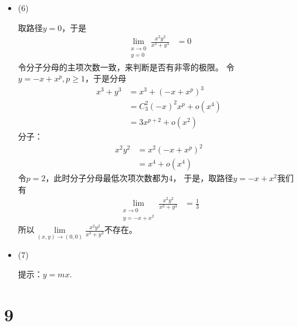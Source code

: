\documentclass{article}
\begin{document}
\begin{itemize}
  \item (6)

        取路径$y = 0$，于是
        \begin{align*}
          \lim\limits_{\substack{x \to 0 \\ y = 0}} \frac{x^2 y^2}{x^3+y^3}
           & = 0
        \end{align*}
        令分子分母的主项次数一致，来判断是否有非零的极限。
        令$y = -x + x^p, p \geq 1$，于是分母
        \begin{align*}
          x^3 + y^3
           & = x^3 + (-x + x^p)^3          \\
           & = C_{3}^2 (-x)^2 x^p + o(x^4) \\
           & = 3 x^{p + 2} + o(x^2)
        \end{align*}
        分子：
        \begin{align*}
          x^2 y^2
           & = x^2 (-x + x^p)^2 \\
           & = x^4 + o(x^4)
        \end{align*}
        令$p = 2$，此时分子分母最低次项次数都为4，
        于是，取路径$y = -x + x^2$我们有
        \begin{align*}
          \lim\limits_{\substack{x \to 0 \\ y = -x + x^2}} \frac{x^2 y^2}{x^3+y^3}
           & = \frac{1}{3}
        \end{align*}
        所以$\lim\limits_{(x, y) \to (0, 0)} \frac{x^2 y^2}{x^3+y^3}$不存在。

  \item (7)

        提示：$y = mx$.
\end{itemize}

\section*{9}
\end{document}
